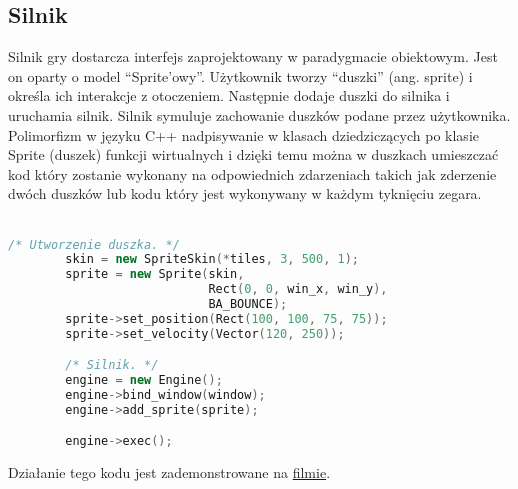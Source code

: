 \documentclass[12pt, titlepage]{article}
\begin{document}
\subsection{Silnik}
Silnik gry dostarcza interfejs zaprojektowany w
paradygmacie obiektowym. Jest on oparty o model
"`Sprite'owy"'. Użytkownik tworzy "`duszki"' (ang.
sprite) i określa ich interakcje z otoczeniem.
Następnie dodaje duszki do silnika i uruchamia
silnik. Silnik symuluje zachowanie duszków
podane przez użytkownika. Polimorfizm w języku C++
nadpisywanie w klasach dziedziczących po klasie
Sprite (duszek) funkcji wirtualnych i dzięki temu
można w duszkach umieszczać kod który zostanie
wykonany na odpowiednich zdarzeniach takich jak
zderzenie dwóch duszków lub kodu który jest
wykonywany w każdym tyknięciu zegara.
\\~
\begin{lstlisting}[language=C++, caption=Interfejs silnika - kod poglądowy]
        /* Utworzenie duszka. */
        skin = new SpriteSkin(*tiles, 3, 500, 1);
        sprite = new Sprite(skin,
                            Rect(0, 0, win_x, win_y),
                            BA_BOUNCE);
        sprite->set_position(Rect(100, 100, 75, 75));
        sprite->set_velocity(Vector(120, 250));

        /* Silnik. */
        engine = new Engine();
        engine->bind_window(window);
        engine->add_sprite(sprite);

        engine->exec();
\end{lstlisting}

\noindent
Działanie tego kodu jest zademonstrowane
na
\href{https://gitlab-stud.elka.pw.edu.pl/aprzyby2/proi_projekt/-/blob/bcad75a44615c7e19fda7ad53a3b5c0541fd482f/docs/project-docs/rc/demo.webm}{filmie}.

\newpage
\end{document}
